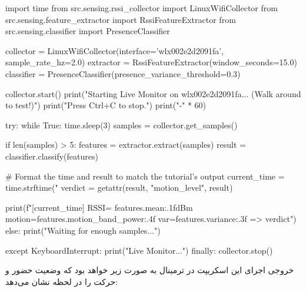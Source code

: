 \documentclass[12pt, a4paper]{article}
\begin{document}
\begin{otherlanguage}{english}
\begin{codebox}
import time
from src.sensing.rssi_collector import LinuxWifiCollector
from src.sensing.feature_extractor import RssiFeatureExtractor
from src.sensing.classifier import PresenceClassifier

collector = LinuxWifiCollector(interface='wlx002e2d2091fa', sample_rate_hz=2.0)
extractor = RssiFeatureExtractor(window_seconds=15.0)
classifier = PresenceClassifier(presence_variance_threshold=0.3)

collector.start()
print("Starting Live Monitor on wlx002e2d2091fa... (Walk around to test!)")
print("Press Ctrl+C to stop.")
print("-" * 60)

try:
    while True:
        time.sleep(3)
        samples = collector.get_samples()
        
        if len(samples) > 5:
            features = extractor.extract(samples)
            result = classifier.classify(features)
            
            # Format the time and result to match the tutorial's output
            current_time = time.strftime("%
            verdict = getattr(result, "motion_level", result)
            
            print(f"[{current_time}] RSSI= {features.mean:.1f}dBm  motion={features.motion_band_power:.4f} var={features.variance:.3f} => {verdict}")
        else:
            print("Waiting for enough samples...")
            
except KeyboardInterrupt:
    print("\nStopping Live Monitor...")
finally:
    collector.stop()
\end{codebox}
\end{otherlanguage}

خروجی اجرای این اسکریپت در ترمینال به صورت زیر خواهد بود که وضعیت حضور و حرکت را در لحظه نشان می‌دهد:
\end{document}
